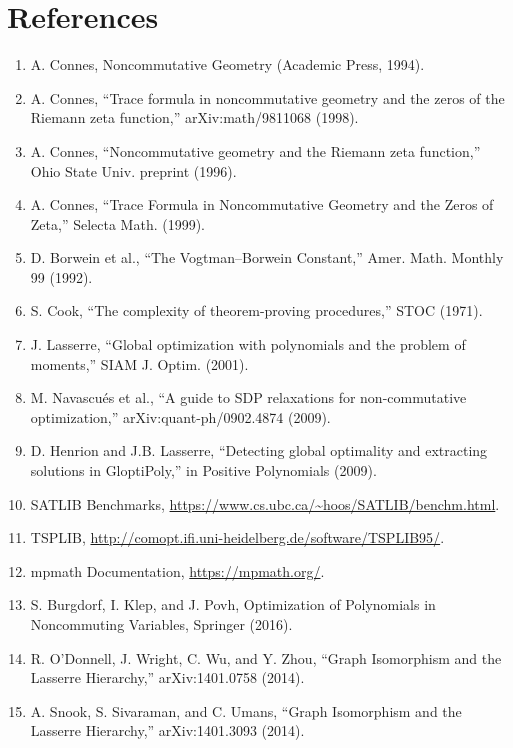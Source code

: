 \documentclass{article}
\begin{document}






\section{References}

\begin{enumerate}
\item A. Connes, Noncommutative Geometry (Academic Press, 1994).
\item A. Connes, ``Trace formula in noncommutative geometry and the zeros of the Riemann zeta function,'' arXiv:math/9811068 (1998).
\item A. Connes, ``Noncommutative geometry and the Riemann zeta function,'' Ohio State Univ. preprint (1996).
\item A. Connes, ``Trace Formula in Noncommutative Geometry and the Zeros of Zeta,'' Selecta Math. (1999).
\item D. Borwein et al., ``The Vogtman--Borwein Constant,'' Amer. Math. Monthly 99 (1992).
\item S. Cook, ``The complexity of theorem-proving procedures,'' STOC (1971).
\item J. Lasserre, ``Global optimization with polynomials and the problem of moments,'' SIAM J. Optim. (2001).
\item M. Navascu\'es et al., ``A guide to SDP relaxations for non-commutative optimization,'' arXiv:quant-ph/0902.4874 (2009).
\item D. Henrion and J.B. Lasserre, ``Detecting global optimality and extracting solutions in GloptiPoly,'' in Positive Polynomials (2009).
\item SATLIB Benchmarks, \url{https://www.cs.ubc.ca/~hoos/SATLIB/benchm.html}.
\item TSPLIB, \url{http://comopt.ifi.uni-heidelberg.de/software/TSPLIB95/}.
\item mpmath Documentation, \url{https://mpmath.org/}.
\item S. Burgdorf, I. Klep, and J. Povh, Optimization of Polynomials in Noncommuting Variables, Springer (2016).
\item R. O'Donnell, J. Wright, C. Wu, and Y. Zhou, ``Graph Isomorphism and the Lasserre Hierarchy,'' arXiv:1401.0758 (2014).
\item A. Snook, S. Sivaraman, and C. Umans, ``Graph Isomorphism and the Lasserre Hierarchy,'' arXiv:1401.3093 (2014).
\end{enumerate}
\end{document}
